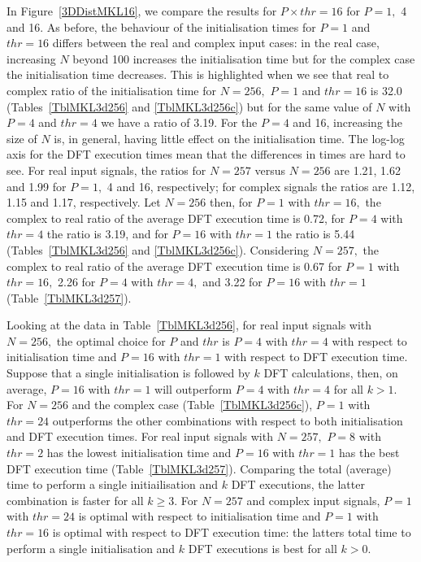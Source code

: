 \documentclass[a4paper]{article}
\begin{document}
In Figure~\ref{3DDistMKL16}, we compare the results for
$P\times thr=16$ for $P=1,$ 4 and 16. As before, the behaviour of the
initialisation times for $P=1$ and $thr=16$ differs between the real
and complex input cases: in the real case, increasing $N$ beyond 100
increases the initialisation time but for the complex case the
initialisation time decreases. This is highlighted when we see that
real to complex ratio of the initialisation time for $N=256,$ $P=1$
and $thr=16$ is 32.0 (Tables~\ref{TblMKL3d256} and
\ref{TblMKL3d256c}) but for the same value of $N$ with $P=4$ and
$thr=4$ we have a ratio of 3.19. For the $P=4$ and 16, increasing the
size of $N$ is, in general, having little effect on the initialisation
time. The log-log axis for the DFT execution times mean that the
differences in times are hard to see. For real input signals, the
ratios for $N=257$ versus $N=256$ are 1.21, 1.62 and 1.99 for $P=1,$ 4
and 16, respectively; for complex signals the ratios are 1.12, 1.15
and 1.17, respectively. Let $N=256$ then, for $P=1$ with $thr=16,$ the
complex to real ratio of the average DFT execution time is 0.72, for
$P=4$ with $thr=4$ the ratio is 3.19, and for $P=16$ with $thr=1$ the
ratio is 5.44 (Tables~\ref{TblMKL3d256} and
\ref{TblMKL3d256c}). Considering $N=257,$ the complex to real ratio
of the average DFT execution time is 0.67 for $P=1$ with $thr=16,$
2.26 for $P=4$ with $thr=4,$ and 3.22 for $P=16$ with $thr=1$
(Table~\ref{TblMKL3d257}).

Looking at the data in Table~\ref{TblMKL3d256}, for real input
signals with $N=256,$ the optimal choice for $P$ and $thr$ is $P=4$
with $thr=4$ with respect to initialisation time and $P=16$ with
$thr=1$ with respect to DFT execution time. Suppose that a single
initialisation is followed by $k$ DFT calculations, then, on average,
$P=16$ with $thr=1$ will outperform $P=4$ with $thr=4$ for all $k>1.$
For $N=256$ and the complex case (Table~\ref{TblMKL3d256c}), $P=1$
with $thr=24$ outperforms the other combinations with respect to both
initialisation and DFT execution times. For real input signals with
$N=257,$ $P=8$ with $thr=2$ has the lowest initialisation time and
$P=16$ with $thr=1$ has the best DFT execution time
(Table~\ref{TblMKL3d257}). Comparing the total (average) time to
perform a single initiailisation and $k$ DFT executions, the latter
combination is faster for all $k\ge 3.$ For $N=257$ and complex input
signals, $P=1$ with $thr=24$ is optimal with respect to initialisation
time and $P=1$ with $thr=16$ is optimal with respect to DFT execution
time: the latters total time to perform a single initialisation and
$k$ DFT executions is best for all $k>0.$
\end{document}
